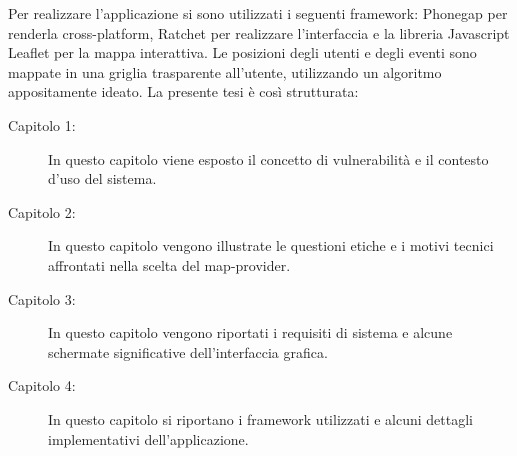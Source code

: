 Per realizzare l'applicazione si sono utilizzati i seguenti framework: Phonegap per renderla cross-platform, Ratchet per realizzare l'interfaccia e la libreria Javascript Leaflet per la mappa interattiva. Le posizioni degli utenti e degli eventi sono mappate in una griglia trasparente all'utente, utilizzando un algoritmo appositamente ideato.
La presente tesi è così strutturata:
\begin{description}
\item [Capitolo 1:] In questo capitolo viene esposto il concetto di vulnerabilità e il contesto d'uso del sistema. 
\item [Capitolo 2:] In questo capitolo vengono illustrate le questioni etiche e i motivi tecnici affrontati nella scelta del map-provider.
\item [Capitolo 3:] In questo capitolo vengono riportati i requisiti di sistema e alcune schermate significative dell'interfaccia grafica.
\item [Capitolo 4:] In questo capitolo si riportano i framework utilizzati e alcuni dettagli implementativi dell'applicazione.
\end{description}